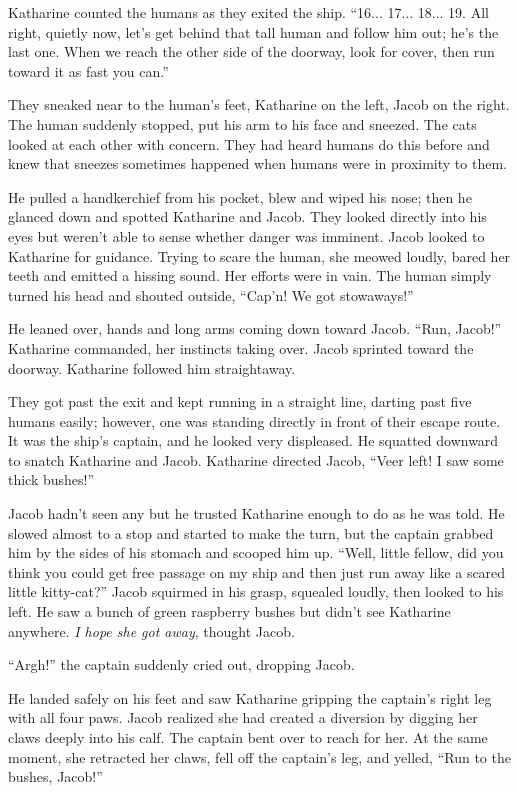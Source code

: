 Katharine counted the humans as they exited the ship. “16... 17... 18... 19. All right, quietly now, let's get behind that tall human and follow him out; he's the last one. When we reach the other side of the doorway, look for cover, then run toward it as fast you can.”

They sneaked near to the human's feet, Katharine on the left, Jacob on the right. The human suddenly stopped, put his arm to his face and sneezed. The cats looked at each other with concern. They had heard humans do this before and knew that sneezes sometimes happened when humans were in proximity to them.

He pulled a handkerchief from his pocket, blew and wiped his nose; then he glanced down and spotted Katharine and Jacob. They looked directly into his eyes but weren't able to sense whether danger was imminent. Jacob looked to Katharine for guidance. Trying to scare the human, she meowed loudly, bared her teeth and emitted a hissing sound. Her efforts were in vain. The human simply turned his head and shouted outside, “Cap'n! We got stowaways!”

He leaned over, hands and long arms coming down toward Jacob. “Run, Jacob!” Katharine commanded, her instincts taking over. Jacob sprinted toward the doorway. Katharine followed him straightaway.

They got past the exit and kept running in a straight line, darting past five humans easily; however, one was standing directly in front of their escape route. It was the ship's captain, and he looked very displeased. He squatted downward to snatch Katharine and Jacob. Katharine directed Jacob, “Veer left! I saw some thick bushes!”

Jacob hadn't seen any but he trusted Katharine enough to do as he was told. He slowed almost to a stop and started to make the turn, but the captain grabbed him by the sides of his stomach and scooped him up. “Well, little fellow, did you think you could get free passage on my ship and then just run away like a scared little kitty-cat?” Jacob squirmed in his grasp, squealed loudly, then looked to his left. He saw a bunch of green raspberry bushes but didn't see Katharine anywhere. \textit{I hope she got away}, thought Jacob.

“Argh!” the captain suddenly cried out, dropping Jacob.

He landed safely on his feet and saw Katharine gripping the captain's right leg with all four paws. Jacob realized she had created a diversion by digging her claws deeply into his calf. The captain bent over to reach for her. At the same moment, she retracted her claws, fell off the captain's leg, and yelled, “Run to the bushes, Jacob!”

